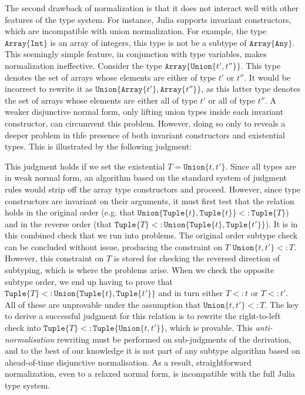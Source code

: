 \documentclass[a4paper,english]{lipics-v2019}
\newcommand{\xt}[1]{\texttt{#1}}
\newcommand{\union}[2]{\xt{Union\{}#1,#2\xt{\}}}
\newcommand{\tuple}[1]{\xt{Tuple\{}#1\xt{\}}}
\newcommand{\arrayt}[1]{\xt{Array\{}#1\xt{\}}}
\begin{document}
The second drawback of normalization is that it does not interact well with
other features of the type system. For instance, Julia supports invariant
constructors, which are incompatible with union normalization. For example,
the type $\arrayt{\xt{Int}}$ is an array of integers, this type is not be a
subtype of $\arrayt{\xt{Any}}$. This seemingly simple feature, in
conjunction with type variables, makes normalization ineffective.  Consider
the type {\small \(\arrayt{\union{t'}{t''}}\)}. This type denotes the set of
arrays whose elements are either of type {\small $t'$} or {\small $t''$}.
It would be incorrect to rewrite it as {\small
  \(\union{\arrayt{t'}}{\arrayt{t''}}\)}, as this latter type denotes the
set of arrays whose elements are either all of type {\small $t'$} or all of
type {\small$t''$}. A weaker disjunctive normal form, only lifting union
types inside each invariant constructor, can circumvent this
problem. However, doing so only to reveals a deeper problem in thfe presence
of both invariant constructors and {existential types}. This is illustrated
by the following judgment:

%
\vspace{-3mm}{\small\[
  \arrayt{\union{\tuple{t}}{\tuple{t'}}} \ \ <:\ \ \exists T\,.\, \arrayt{\tuple{T}}
\]}\vspace{-3mm}
%

\noindent 
This judgment holds if we set the existential {\small$T=\union{t}{t'}$}.
Since all types are in weak normal form, an algorithm based on the standard
system of judgment rules would strip off the array type constructors and
proceed.  However, since type constructors are invariant on their arguments,
it must first test that the relation holds in the original order (e.g. that
{\small$\union{\tuple{t}}{\tuple{t}}<:\tuple{T}$}) and in the reverse order
(that {\small$\tuple{T}<:\union{\tuple{t}}{\tuple{t'}}$}). It is in this
combined check that we run into problems.
%
The original order subtype check can be concluded without issue, producing
the constraint on $T$ {\small$\union{t}{t'} <: T$}. However, this constraint
on $T$ is stored for checking the reversed direction of subtyping, which is
where the problems arise. When we check the opposite subtype order, we end
up having to prove that {\small$\tuple{T}<:\union{\tuple{t}}{\tuple{t'}}$}
and in turn either {\small$T<:t$} or {\small$T<:t'$}. All of these are
unprovable under the assumption that {\small$\union{t}{t'} <: T$}.
%
The key to derive a successful judgment for this relation is to rewrite the
right-to-left check into {\small$\tuple{T}<:\tuple{\union{t}{t'}}$}, which is
provable. This \emph{anti-normalisation} rewriting must be performed on
sub-judgments of the derivation, and to the best of our knowledge it is not
part of any subtype algorithm based on ahead-of-time disjunctive
normalisation. As a result, straightforward normalization, even to a relaxed
normal form, is incompatible with the full Julia type system.
\end{document}
